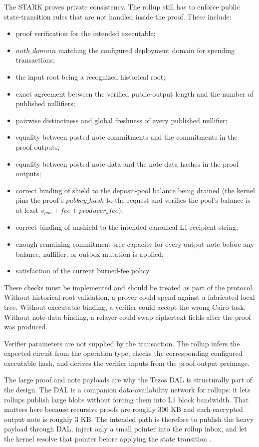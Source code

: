 \documentclass[11pt]{article}
\begin{document}
The STARK proves private consistency. The rollup still has to enforce public
state-transition rules that are not handled inside the proof. These include:

\begin{itemize}
  \item proof verification for the intended executable;
  \item \(auth\_domain\) matching the configured deployment domain for
        spending transactions;
  \item the input root being a recognized historical root;
  \item exact agreement between the verified public-output length and the
        number of published nullifiers;
  \item pairwise distinctness and global freshness of every published
        nullifier;
  \item equality between posted note commitments and the commitments in the
        proof outputs;
  \item equality between posted note data and the note-data hashes in the
        proof outputs;
  \item correct binding of shield to the deposit-pool balance being drained
        (the kernel pins the proof's \(pubkey\_hash\) to the request and
        verifies the pool's balance is at least
        \(v_{pub} + fee + producer\_fee\));
  \item correct binding of unshield to the intended canonical L1 recipient
        string;
  \item enough remaining commitment-tree capacity for every output note before
        any balance, nullifier, or outbox mutation is applied;
  \item satisfaction of the current burned-fee policy.
\end{itemize}

These checks must be implemented and should be treated as part of the protocol.
Without historical-root validation, a prover could spend against a fabricated local
tree. Without executable binding, a verifier could accept the wrong Cairo task.
Without note-data binding, a relayer could swap ciphertext fields after the
proof was produced.

Verifier parameters are not supplied by the transaction. The rollup infers the
expected circuit from the operation type, checks the corresponding configured
executable hash, and derives the verifier inputs from the proof output
preimage.

The large proof and note payloads are why the Tezos DAL is structurally part of
the design. The DAL is a companion data-availability network for rollups: it
lets rollups publish large blobs without forcing them into L1 block bandwidth.
That matters here because recursive proofs are roughly 300 KB and each encrypted
output note is roughly 3 KB. The intended path is therefore to publish the
heavy payload through DAL, inject only a small pointer into the rollup inbox,
and let the kernel resolve that pointer before applying the state transition
\cite{tezos-smart-rollups,tezos-dal}.
\end{document}
